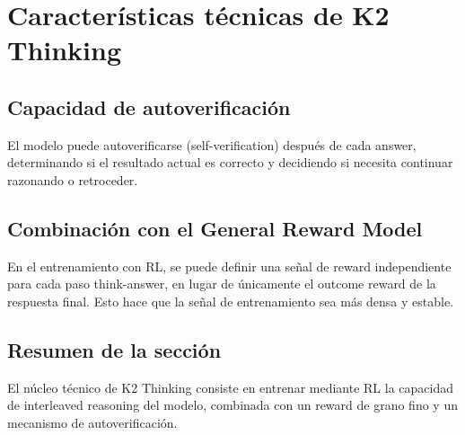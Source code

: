 \section{Características técnicas de K2 Thinking}

\subsection{Capacidad de autoverificación}

El modelo puede autoverificarse (self-verification) después de cada answer, determinando si el resultado actual es correcto y decidiendo si necesita continuar razonando o retroceder.

\subsection{Combinación con el General Reward Model}

En el entrenamiento con RL, se puede definir una señal de reward independiente para cada paso think-answer, en lugar de únicamente el outcome reward de la respuesta final. Esto hace que la señal de entrenamiento sea más densa y estable.

\subsection{Resumen de la sección}

El núcleo técnico de K2 Thinking consiste en entrenar mediante RL la capacidad de interleaved reasoning del modelo, combinada con un reward de grano fino y un mecanismo de autoverificación.
